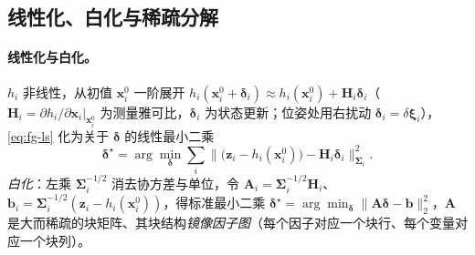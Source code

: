 \subsection{线性化、白化与稀疏分解}
\label{sec:est-fg-linear}

\paragraph{线性化与白化。}
$h_i$ 非线性，从初值 $\mathbf{x}_i^0$ 一阶展开 $h_i(\mathbf{x}_i^0+\boldsymbol{\delta}_i)\approx h_i(\mathbf{x}_i^0)+\mathbf{H}_i\boldsymbol{\delta}_i$（$\mathbf{H}_i=\partial h_i/\partial\mathbf{x}_i|_{\mathbf{x}_i^0}$ 为测量雅可比，$\boldsymbol{\delta}_i$ 为状态更新；位姿处用右扰动 $\boldsymbol{\delta}_i=\delta\boldsymbol{\xi}_i$），\cref{eq:fg-ls} 化为关于 $\boldsymbol{\delta}$ 的线性最小二乘
\begin{equation}
  \boldsymbol{\delta}^\star=\arg\min_{\boldsymbol{\delta}}\sum_i\big\|\big(\mathbf{z}_i-h_i(\mathbf{x}_i^0)\big)-\mathbf{H}_i\boldsymbol{\delta}_i\big\|_{\boldsymbol{\Sigma}_i}^2.
  \label{eq:fg-linearized}
\end{equation}
\emph{白化}：左乘 $\boldsymbol{\Sigma}_i^{-1/2}$ 消去协方差与单位\cite{carlone2026handbook}，令 $\mathbf{A}_i=\boldsymbol{\Sigma}_i^{-1/2}\mathbf{H}_i$、$\mathbf{b}_i=\boldsymbol{\Sigma}_i^{-1/2}(\mathbf{z}_i-h_i(\mathbf{x}_i^0))$，得标准最小二乘 $\boldsymbol{\delta}^\star=\arg\min_{\boldsymbol{\delta}}\|\mathbf{A}\boldsymbol{\delta}-\mathbf{b}\|_2^2$，$\mathbf{A}$ 是大而稀疏的块矩阵、其块结构\emph{镜像因子图}（每个因子对应一个块行、每个变量对应一个块列）。

